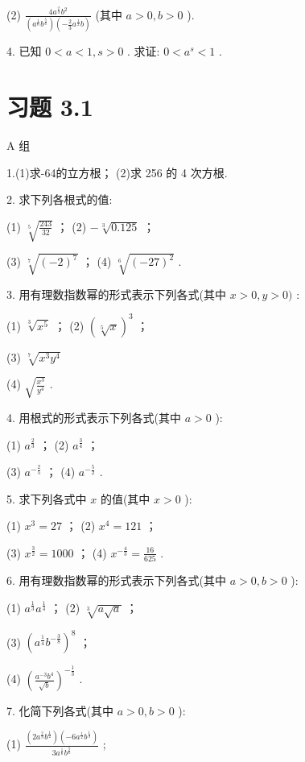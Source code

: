 \documentclass[10pt]{article}
\begin{document}
(2) \(\frac{4{a}^{\frac{2}{3}}{b}^{2}}{\left( {{a}^{\frac{1}{6}}{b}^{\frac{5}{6}}}\right) \left( {-\frac{2}{3}{a}^{\frac{1}{2}}b}\right) }\) (其中 \(a > 0,b > 0\) ).

4. 已知 \(0 < a < 1,s > 0\) . 求证: \(0 < {a}^{s} < 1\) .

\section*{习题 3.1}

A 组

1.(1)求-64的立方根； (2)求 256 的 4 次方根.

2. 求下列各根式的值:

(1) \(\sqrt[5]{\frac{243}{32}}\) ； (2) \(- \sqrt[3]{0.125}\) ；

(3) \(\sqrt[7]{{\left( -2\right) }^{7}}\) ； (4) \(\sqrt[6]{{\left( -{27}\right) }^{2}}\) .

3. 用有理数指数幂的形式表示下列各式(其中 \(x > 0,y > 0)\) :

(1) \(\sqrt[3]{{x}^{5}}\) ； (2) \({\left( \sqrt[5]{x}\right) }^{3}\) ；

(3) \(\sqrt[7]{{x}^{3}{y}^{4}}\)

(4) \(\sqrt{\frac{{x}^{3}}{{y}^{4}}}\) .



4. 用根式的形式表示下列各式(其中 \(a > 0\) ):

(1) \({a}^{\frac{2}{3}}\) ； (2) \({a}^{\frac{3}{4}}\) ；

(3) \({a}^{-\frac{2}{5}}\) ； (4) \({a}^{-\frac{5}{2}}\) .

5. 求下列各式中 \(x\) 的值(其中 \(x > 0\) ):

(1) \({x}^{3} = {27}\) ； (2) \({x}^{4} = {121}\) ；

(3) \({x}^{\frac{3}{2}} = {1000}\) ； (4) \({x}^{-\frac{4}{3}} = \frac{16}{625}\) .

6. 用有理数指数幂的形式表示下列各式(其中 \(a > 0,b > 0\) ):

(1) \({a}^{\frac{1}{3}}{a}^{\frac{1}{4}}\) ； (2) \(\sqrt[3]{a\sqrt{a}}\) ；

(3) \({\left( {a}^{\frac{1}{4}}{b}^{-\frac{3}{8}}\right) }^{8}\) ；

(4) \({\left( \frac{{a}^{-3}{b}^{4}}{\sqrt{b}}\right) }^{-\frac{1}{3}}\) .

7. 化简下列各式(其中 \(a > 0,b > 0\) ):

(1) \(\frac{\left( {2{a}^{\frac{2}{3}}{b}^{\frac{1}{2}}}\right) \left( {-6{a}^{\frac{1}{2}}{b}^{\frac{1}{3}}}\right) }{3{a}^{\frac{1}{6}}{b}^{\frac{5}{6}}}\) ;
\end{document}
